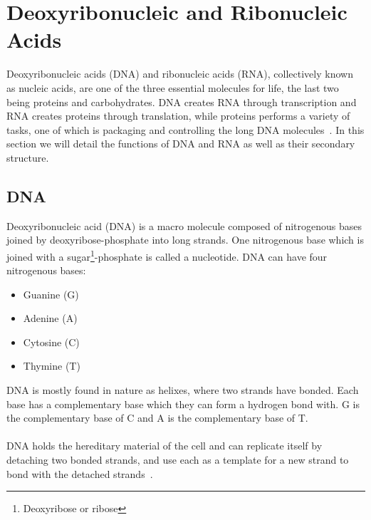 \section{Deoxyribonucleic and Ribonucleic Acids}
Deoxyribonucleic acids (DNA) and ribonucleic acids (RNA), collectively known as 
nucleic acids, are one of the three 
essential molecules for life, the last two being proteins and carbohydrates. 
DNA creates RNA through transcription and RNA creates proteins through 
translation, while proteins performs a variety of tasks, one 
of which is packaging and controlling the long DNA molecules~\cite[p. 172]{alberts}. 
In this section we will detail the functions of DNA and RNA as well as their 
secondary structure.
\subsection{DNA}
Deoxyribonucleic acid (DNA) is a macro molecule composed of nitrogenous bases 
joined by deoxyribose-phosphate into long strands. One nitrogenous base which 
is joined with a sugar\footnote{Deoxyribose or ribose}-phosphate is called a 
nucleotide. DNA can have four nitrogenous bases:
\begin{itemize}
\item Guanine (G)
\item Adenine (A)
\item Cytosine (C)
\item Thymine (T)
\end{itemize}
DNA is mostly found in nature as helixes, where two strands have bonded. Each 
base has a complementary base which they can form a hydrogen bond with. 
G is the complementary base of C and A is the complementary base of T.\\\\
DNA holds the hereditary material of the cell and can replicate itself by 
detaching two bonded strands, and use each as a template for a new strand 
to bond with the detached strands~\cite[p. 199]{alberts}.
